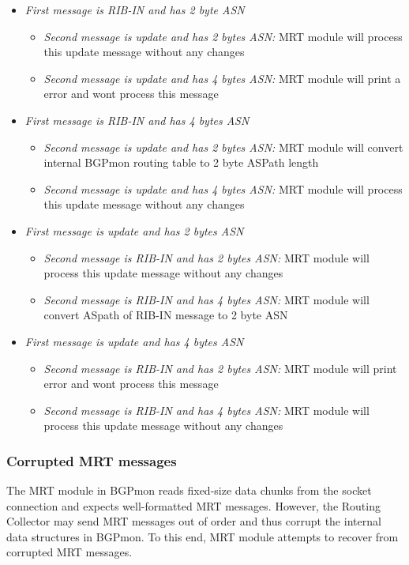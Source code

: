 \begin{itemize}
\item{\emph{First message is RIB-IN and has 2 byte ASN}}
	\begin{itemize}
		\item{\emph{Second message is update and has 2 bytes ASN:} MRT module will process this update message without any changes}
		\item{\emph{Second message is update and has 4 bytes ASN:} MRT module will print a error and wont process this message}
	\end{itemize}
\item{\emph{First message is RIB-IN and has 4 bytes ASN}}
	\begin{itemize}
		\item{\emph{Second message is update and has 2 bytes ASN:} MRT module will convert internal BGPmon routing table to 2 byte ASPath length}
		\item{\emph{Second message is update and has 4 bytes ASN:} MRT module will process this update message without any changes}
	\end{itemize}
\item{\emph{First message is update and has 2 bytes ASN}}
	\begin{itemize}
		\item{\emph{Second message is RIB-IN and has 2 bytes ASN:} MRT module will process this update message without any changes}
		\item{\emph{Second message is RIB-IN and has 4 bytes ASN:} MRT module will convert ASpath of RIB-IN message to 2 byte ASN }
	\end{itemize}		
\item{\emph{First message is update and has 4 bytes ASN}}
	\begin{itemize}
		\item{\emph{Second message is RIB-IN and has 2 bytes ASN:} MRT module will print error and wont process this message}
		\item{\emph{Second message is RIB-IN and has 4 bytes ASN:} MRT module will process this update message without any changes}
	\end{itemize}	
\end{itemize}

\subsubsection{Corrupted MRT messages}


The MRT module in BGPmon reads fixed-size data chunks from the socket connection and expects well-formatted MRT messages. However, the Routing Collector may send  MRT messages out of order and thus corrupt the internal data structures in BGPmon. To this end, MRT module attempts to recover from corrupted MRT messages.  

